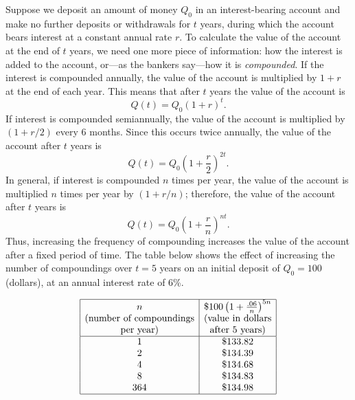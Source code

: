 \documentclass{ximera}
\begin{document}
Suppose we deposit an amount of money $Q_0$  in an
interest-bearing account and make no further deposits or withdrawals
for $t$ years, during which the account bears interest at a constant
annual rate $r$. To calculate the value of the account at the
end of $t$ years, we need one more piece of information: how the
interest is added to the account, or---as the bankers say---how it
is \textit{compounded}. If the interest is compounded annually,  the
value of the account is multiplied by $1+r$ at the end of each year.
This means that after $t$ years the value of the account is
$$
Q(t)=Q_0(1+r)^t.
$$
If interest is compounded semiannually,  the
value of the account is multiplied by $(1+r/2)$ every 6 months.
Since this occurs twice annually, the value of the account after $t$
years is
$$
Q(t)=Q_0\left(1+\frac{r}{2}\right)^{2t}.
$$
In general, if interest is compounded $n$ times per year, the value of
the account is multiplied $n$ times per year by $(1+r/n)$;  therefore,
the value of the account
after $t$ years is
\begin{equation} \label{eq:4.1.8}
Q(t)=Q_0\left(1+\frac{r}{n}\right)^{nt}.
\end{equation}
Thus, increasing the  frequency of  compounding increases the value of the
account after a fixed period of time. The table below shows the
effect
of increasing the number of compoundings over $t=5$ years on an initial
deposit of $Q_0=100$ (dollars), at an annual interest rate of 6\%.


$$\begin{array}{|c|c|}\hline
n & \$100 \left(1+\frac{.06}{n}\right)^{5n}\\
\text{(number of compoundings} &   \text{(value in dollars}\\
\text{per year)} &\text{after 5 years)}\\
\hline
1 & \$133.82 \\
2 & \$134.39 \\
4 & \$134.68 \\
8 & \$134.83 \\
364 & \$134.98 \\\hline
\end{array}$$
\end{document}

